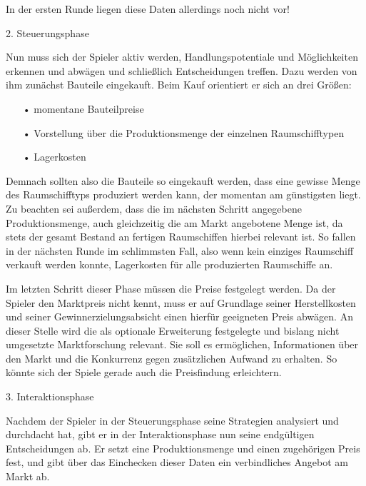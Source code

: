 In der ersten Runde liegen diese Daten allerdings noch nicht vor! 


{\Large 2. Steuerungsphase}

Nun muss sich der Spieler aktiv werden, Handlungspotentiale und Möglichkeiten erkennen und abwägen und schließlich Entscheidungen treffen. Dazu werden von ihm zunächst Bauteile eingekauft. Beim Kauf orientiert er sich an drei Größen: 

\begin{itemize}
\item[•] momentane Bauteilpreise
\item[•] Vorstellung über die Produktionsmenge der einzelnen Raumschifftypen
\item[•] Lagerkosten 
\end{itemize}

Demnach sollten also die Bauteile so eingekauft werden, dass eine gewisse Menge des Raumschifftyps produziert werden kann, der momentan am günstigsten liegt. Zu beachten sei außerdem, dass die im nächsten Schritt angegebene Produktionsmenge, auch gleichzeitig die am Markt angebotene Menge ist, da stets der gesamt Bestand an fertigen Raumschiffen hierbei relevant ist. So fallen in der nächsten Runde im schlimmsten Fall, also wenn kein einziges Raumschiff verkauft werden konnte, Lagerkosten für alle produzierten Raumschiffe an.  

Im letzten Schritt dieser Phase müssen die Preise festgelegt werden. Da der Spieler den Marktpreis nicht kennt, muss er auf Grundlage seiner Herstellkosten und seiner Gewinnerzielungsabsicht einen hierfür geeigneten Preis abwägen. An dieser Stelle wird die als optionale Erweiterung festgelegte und bislang nicht umgesetzte Marktforschung relevant.  Sie soll es ermöglichen, Informationen über den Markt und die Konkurrenz gegen zusätzlichen Aufwand zu erhalten. So könnte sich der Spiele gerade auch die Preisfindung erleichtern. 


{\Large 3. Interaktionsphase}

Nachdem der Spieler in der Steuerungsphase seine Strategien analysiert und durchdacht hat, gibt er in der Interaktionsphase nun seine endgültigen Entscheidungen ab. Er setzt eine Produktionsmenge und einen zugehörigen Preis fest, und gibt über das Einchecken dieser Daten ein verbindliches Angebot am Markt ab. 





